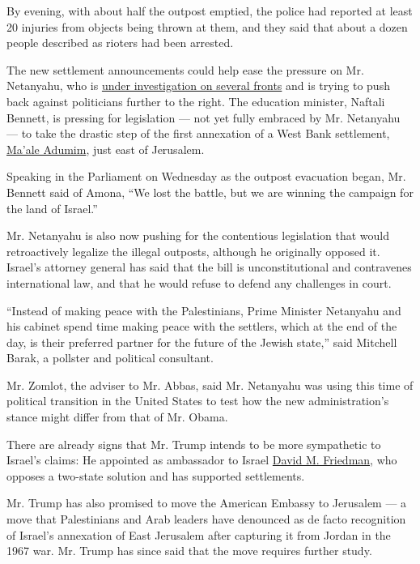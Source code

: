 By evening, with about half the outpost emptied, the police had reported
at least 20 injuries from objects being thrown at them, and they said
that about a dozen people described as rioters had been arrested.

The new settlement announcements could help ease the pressure on Mr.
Netanyahu, who is
\href{https://www.nytimes.com/2017/01/03/world/middleeast/israel-netanyahu-graft-investigation.html}{under
investigation on several fronts} and is trying to push back against
politicians further to the right. The education minister, Naftali
Bennett, is pressing for legislation --- not yet fully embraced by Mr.
Netanyahu --- to take the drastic step of the first annexation of a West
Bank settlement,
\href{https://www.nytimes.com/2017/01/30/world/middleeast/the-sleepy-israeli-settlement-thats-fast-becoming-a-flash-point.html}{Ma'ale
Adumim}, just east of Jerusalem.

Speaking in the Parliament on Wednesday as the outpost evacuation began,
Mr. Bennett said of Amona, ``We lost the battle, but we are winning the
campaign for the land of Israel.''

Mr. Netanyahu is also now pushing for the contentious legislation that
would retroactively legalize the illegal outposts, although he
originally opposed it. Israel's attorney general has said that the bill
is unconstitutional and contravenes international law, and that he would
refuse to defend any challenges in court.

``Instead of making peace with the Palestinians, Prime Minister
Netanyahu and his cabinet spend time making peace with the settlers,
which at the end of the day, is their preferred partner for the future
of the Jewish state,'' said Mitchell Barak, a pollster and political
consultant.

Mr. Zomlot, the adviser to Mr. Abbas, said Mr. Netanyahu was using this
time of political transition in the United States to test how the new
administration's stance might differ from that of Mr. Obama.

There are already signs that Mr. Trump intends to be more sympathetic to
Israel's claims: He appointed as ambassador to Israel
\href{https://www.nytimes.com/2016/12/16/world/middleeast/david-friedman-us-ambassador-israel.html}{David
M. Friedman}, who opposes a two-state solution and has supported
settlements.

Mr. Trump has also promised to move the American Embassy to Jerusalem
--- a move that Palestinians and Arab leaders have denounced as de facto
recognition of Israel's annexation of East Jerusalem after capturing it
from Jordan in the 1967 war. Mr. Trump has since said that the move
requires further study.

